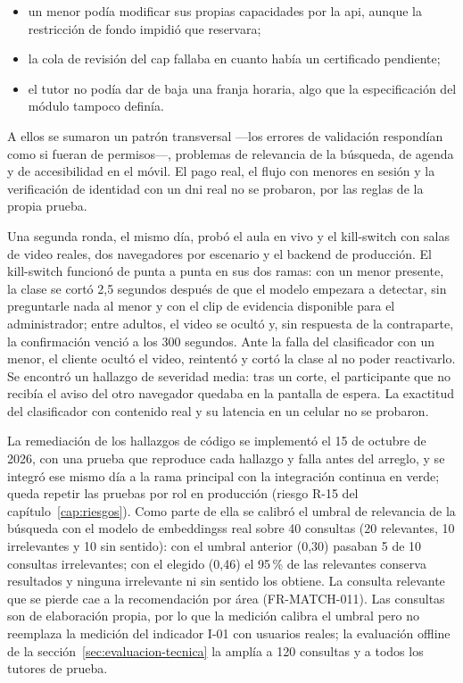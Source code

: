 \begin{itemize}
    \item un menor podía modificar sus propias capacidades por la
          \gls{api}, aunque la restricción de fondo impidió que reservara;
    \item la cola de revisión del \gls{cap} fallaba en cuanto había un
          certificado pendiente;
    \item el tutor no podía dar de baja una franja horaria, algo que la
          especificación del módulo tampoco definía.
\end{itemize}

A ellos se sumaron un patrón transversal ---los errores de validación
respondían como si fueran de permisos---, problemas de relevancia de la
búsqueda, de agenda y de accesibilidad en el móvil. El pago real, el
flujo con menores en sesión y la verificación de identidad con un
\gls{dni} real no se probaron, por las reglas de la propia prueba.

Una segunda ronda, el mismo día, probó el aula en vivo y el kill-switch
con salas de video reales, dos navegadores por escenario y el backend de
producción. El kill-switch funcionó de punta a punta en sus dos ramas:
con un menor presente, la clase se cortó 2,5 segundos después de que el
modelo empezara a detectar, sin preguntarle nada al menor y con el clip
de evidencia disponible para el administrador; entre adultos, el video
se ocultó y, sin respuesta de la contraparte, la confirmación venció a
los 300 segundos. Ante la falla del clasificador con un menor, el cliente
ocultó el video, reintentó y cortó la clase al no poder reactivarlo. Se
encontró un hallazgo de severidad media: tras un corte, el participante
que no recibía el aviso del otro navegador quedaba en la pantalla de
espera. La exactitud del clasificador con contenido real y su latencia en
un celular no se probaron.

La remediación de los hallazgos de código se implementó el 15 de octubre de
2026, con una prueba que reproduce cada hallazgo y falla antes del
arreglo, y se integró ese mismo día a la rama principal con la
integración continua en verde; queda repetir las pruebas por rol en
producción (riesgo R-15 del capítulo~\ref{cap:riesgos}). Como parte de ella se calibró el
umbral de relevancia de la búsqueda con el modelo de \glspl{embeddings}
real sobre 40 consultas (20 relevantes, 10 irrelevantes y 10 sin
sentido): con el umbral anterior (0,30) pasaban 5 de 10 consultas
irrelevantes; con el elegido (0,46) el 95\,\% de las relevantes conserva
resultados y ninguna irrelevante ni sin sentido los obtiene. La consulta
relevante que se pierde cae a la recomendación por área (FR-MATCH-011).
Las consultas son de elaboración propia, por lo que la medición calibra
el umbral pero no reemplaza la medición del indicador I-01 con usuarios
reales; la evaluación offline de la sección~\ref{sec:evaluacion-tecnica}
la amplía a 120 consultas y a todos los tutores de prueba.

